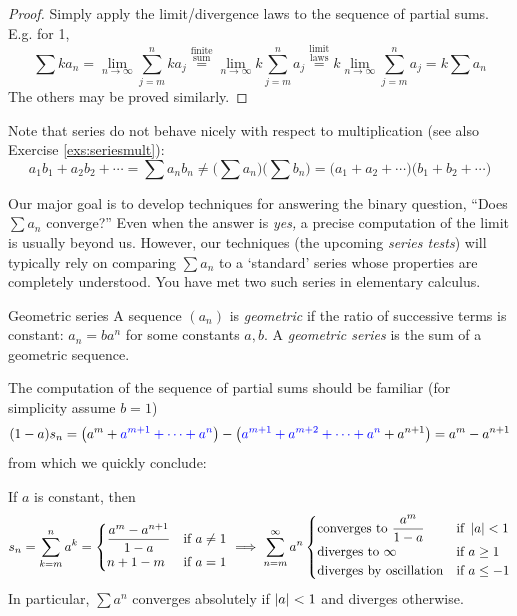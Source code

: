 \begin{proof}
	Simply apply the limit/divergence laws to the sequence of partial sums. E.g.{} for 1,
	\[
	  \sum ka_n = \lim_{n\to\infty}\sum_{j=m}^nka_j \overset{\text{finite}}{\overset{\text{sum}}{=}} \lim_{n\to\infty}k\sum_{j=m}^na_j \overset{\text{limit}}{\overset{\text{laws}}{=}} k\lim_{n\to\infty}\sum_{j=m}^na_j =k\sum a_n
	\]
	The others may be proved similarly.
\end{proof}


Note that series do not behave nicely with respect to multiplication (see also Exercise \ref{exs:seriesmult}):
\[
	a_1b_1+a_2b_2+\cdots =\sum a_nb_n\neq \bigl(\sum a_n\bigr)\bigl(\sum b_n\bigr) =\bigl(a_1+a_2+\cdots\bigr)\bigl(b_1+b_2+\cdots\bigr)
\]

\goodbreak



Our major goal is to develop techniques for answering the binary question, ``Does $\sum a_n$ converge?'' Even when the answer is \emph{yes,} a precise computation of the limit is usually beyond us. However, our techniques (the upcoming \emph{series tests}) will typically rely on comparing $\sum a_n$ to a `standard' series whose properties are completely understood. You have met two such series in elementary calculus.

\begin{defn}{Geometric series}{}
	A sequence $(a_n)$ is \emph{geometric} if the ratio of successive terms is constant: $a_n=ba^n$ for some constants $a,b$. A \emph{geometric series} is the sum of a geometric sequence. 
\end{defn}

The computation of the sequence of partial sums should be familiar (for simplicity assume $b=1$)
\[(1-a)s_n=\bigl(a^m+\textcolor{blue}{a^{m+1}+\cdots+a^n}\bigr)-\bigl(\textcolor{blue}{a^{m+1}+a^{m+2}+\cdots +a^n}+a^{n+1}\bigr) =a^m-a^{n+1}\]
from which we quickly conclude:

\begin{thm}{}{}
	If $a$ is constant, then
	\[s_n=\sum_{k=m}^n a^k=\begin{cases}
	\dfrac{a^m-a^{n+1}}{1-a}&\text{if }a\neq 1\\
	n+1-m&\text{if }a=1
	\end{cases}\implies \sum_{n=m}^\infty a^n\begin{cases}
	\text{converges to }\dfrac{a^m}{1-a}&\text{if }\left| a\right|<1\\
	\text{diverges to $\infty$}&\text{if }a\ge 1\\
	\text{diverges by oscillation}&\text{if }a\le -1
	\end{cases}\]
	In particular, $\sum a^n$ converges absolutely if $\left| a\right|<1$ and diverges otherwise. 
\end{thm}


